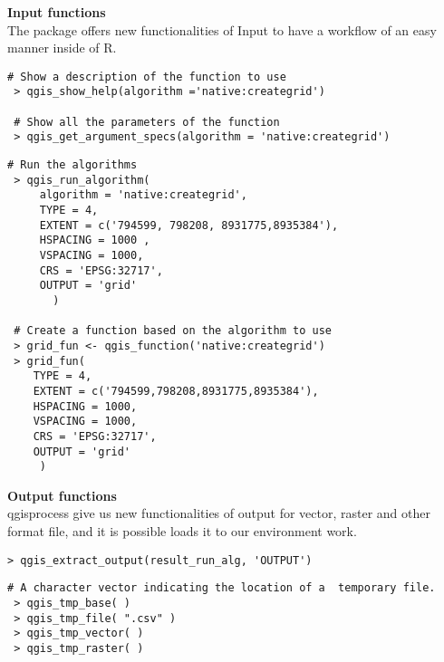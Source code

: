\documentclass{article}
\begin{document}
\begin{multicols*}{3}
\begin{minipage}{\linewidth}
  \vspace{-5pt}
   \textbf{\fontsize{44}{44}\selectfont \textbf{Input functions}}\vspace{8pt}\\ 
   The package offers new functionalities of Input to have a workflow of an easy manner inside of R.
\end{minipage}
\begin{lstlisting}[style=Rstyle]
 # Show a description of the function to use
 > qgis_show_help(algorithm ='native:creategrid')

 # Show all the parameters of the function
 > qgis_get_argument_specs(algorithm = 'native:creategrid')
\end{lstlisting}
\begin{lstlisting}[style=Rstyle]
 # Run the algorithms
 > qgis_run_algorithm( 
     algorithm = 'native:creategrid',
     TYPE = 4,
     EXTENT = c('794599, 798208, 8931775,8935384'),
     HSPACING = 1000 ,
     VSPACING = 1000,
     CRS = 'EPSG:32717',
     OUTPUT = 'grid'
       )

 # Create a function based on the algorithm to use 
 > grid_fun <- qgis_function('native:creategrid')
 > grid_fun(
    TYPE = 4,
    EXTENT = c('794599,798208,8931775,8935384'),
    HSPACING = 1000,
    VSPACING = 1000,
    CRS = 'EPSG:32717',
    OUTPUT = 'grid'
     )
\end{lstlisting}

\begin{minipage}{\linewidth}
  \vspace{12pt}
   \textbf{\fontsize{20}{5}\selectfont \textbf{Output functions}}\vspace{8pt}\\ 
qgisprocess give us new functionalities of output for vector, raster and other format file, and it is possible loads it  to our environment work.
\end{minipage}

\begin{lstlisting}[style=Rstyle]
 > qgis_extract_output(result_run_alg, 'OUTPUT')
\end{lstlisting}
\begin{lstlisting}[style=Rstyle]
# A character vector indicating the location of a  temporary file.
 > qgis_tmp_base( )
 > qgis_tmp_file( ".csv" )
 > qgis_tmp_vector( )
 > qgis_tmp_raster( )
\end{lstlisting}


\end{multicols*}
\end{document}
